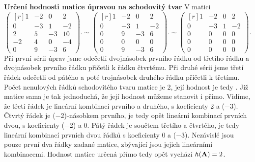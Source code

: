 \wikitextrule
\begin{example}\label{MAI:exam083} 
  \textbf{Určení hodnosti matice úpravou na schodovitý tvar}\newline\small
  V matici
  \begin{equation*}
    \begin{pmatrix}[r]
        1 & -2 &  0 &  2  \\
        0 & -3 &  1 & -2  \\
        2 &  5 & -3 & 10  \\
       -2 &  4 &  0 & -4  \\
        0 &  9 & -3 &  6
    \end{pmatrix}. \sim
    \begin{pmatrix}[r]
        1 & -2 &  0 &  2  \\
        0 & -3 &  1 & -2  \\
        0 &  9 & -3 &  6  \\
        0 &  0 &  0 &  0  \\
        0 &  9 & -3 &  6
    \end{pmatrix}. \sim
    \begin{pmatrix}[r]
        1 & -2 &  0 &  2  \\
        0 & -3 &  1 & -2  \\
        0 &  0 &  0 &  0  \\
        0 &  0 &  0 &  0  \\
        0 &  0 &  0 &  0
    \end{pmatrix}.
  \end{equation*}
  Při první sérii úprav jsme odečetli dvojnásobek prvního řádku od třetího řádku a dvojnásobek 
  prvního řádku přičetli k řádku čtvrtému. Při druhé sérii jsme třetí řádek odečetli od pátého a 
  poté trojnásobek druhého řádku přičetli k třetímu. Počet nenulových řádků schodovitého tvaru 
  matice je \(\num{2}\), její hodnost je tedy . Již matice sama je tak jednoduchá, že její hodnost 
  můžeme stanovit i přímo. Vidíme, že třetí řádek je lineární kombinací prvního a druhého, s 
  koeficienty \num{2} a (\num{-3}). Čtvrtý řádek je (\num{-2})-násobkem prvního, je tedy opět 
  lineární kombinací prvních dvou, s koeficienty (\num{-2}) a \num{0}. Pátý řádek je součtem 
  třetího a čtvrtého, je tedy lineární kombinací prvních dvou řádků s koeficienty \num{0} a 
  (\num{-3}). Nezávislé jsou pouze první dva řádky zadané matice, zbývající jsou jejich lineárními 
  kombinacemi. Hodnost matice určená přímo tedy opět vychází \(h(\mathbf{A}) = 2\).
  \normalsize
\end{example}